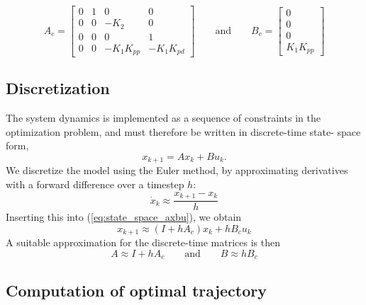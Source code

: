 \begin{equation}
    A_c = \begin{bmatrix} 0 & 1 & 0 & 0 \\ 0 & 0 & -K_2 & 0 \\ 0 & 0 & 0 & 1 \\ 0 & 0 & -K_1K_{pp} & -K_1K_{pd} \end{bmatrix}
    \qquad\text{and}\qquad
    B_c = \begin{bmatrix}0 \\ 0 \\ 0 \\K_1K_{pp} \end{bmatrix}
\end{equation}

\subsection{Discretization}

The system dynamics is implemented as a sequence of constraints in the
optimization problem, and must therefore be written in discrete-time state-
space form,
\begin{equation}
    x_{k+1} = Ax_k + Bu_k.
    \label{eq:discrete_state_space_axbu}
\end{equation}
We discretize the model using the Euler method, by approximating derivatives
with a forward difference over a timestep $h$:
\begin{equation}
    \dot{x}_k \approx \frac{x_{k+1} - x_k}{h}
\end{equation}
Inserting this into (\ref{eq:state_space_axbu}), we obtain
\begin{equation}
    x_{k+1} \approx (I + hA_c) x_k + hB_c u_k
\end{equation}
A suitable approximation for the discrete-time matrices is then
\begin{equation}
    A \approx I + hA_c
    \qquad\text{and}\qquad
    B \approx hB_c
\end{equation}

\subsection{Computation of optimal trajectory}

